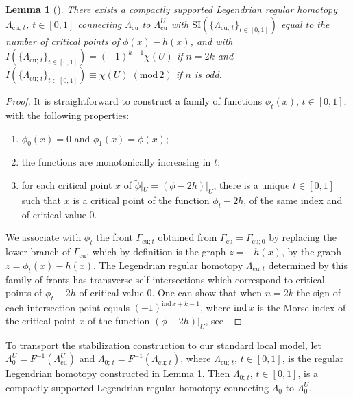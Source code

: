 \documentclass[reqno,11pt]{amsart}
\numberwithin{equation}{section}
\theoremstyle{my}
\theoremstyle{my}
\newtheorem{Lemma}[thm]{Lemma}
\theoremstyle{your}
\newcommand{\ind}{\mathrm{ind}}
\newcommand{\cu}{\mathrm{cu}}
\newcommand{\SI}{\mathrm{SI}}
\newcommand{\wt}{\widetilde}
\begin{document}
\begin{Lemma}[\cite{CieEli-Stein, Mur}]\label{lm:stab}
There exists a compactly supported Legendrian regular homotopy $\Lambda_{\cu;\,t}$, $t\in[0,1]$ connecting $\Lambda_\cu$ to $\Lambda^{U}_\cu$ with $\SI\left(\{\Lambda_{\cu;\,t}\}_{t\in[0,1]}\right)$ equal to the number of critical points of $\phi(x)-h(x)$, and with $I\left(\{\Lambda_{\cu;\,t}\}_{t\in[0,1]}\right)= (-1)^{k-1}\chi(U)$ if $n=2k$  and $I\left(\{\Lambda_{\cu;\,t}\}_{t\in[0,1]}\right)\equiv \chi(U)\; (\mathrm{mod}\, 2)$ if $n$ is odd.  
\end{Lemma}

\begin{proof}
It is straightforward to construct a family of functions $\phi_t(x)$, $t\in[0,1]$, with the following properties: 
\begin{enumerate}
\item  $\phi_0(x)=0$ and $\phi_1(x)=\phi(x) $;
\item the functions  are monotonically increasing in $t$; 
\item  for each critical point $x$ of $\wt\phi|_U=(\phi-2h)|_U$, there is a unique $t\in[0,1]$ such that $x$ is a critical point of  the function $\phi_t-2h$, of the same index and of critical value $0$.
\end{enumerate}
We associate with $\phi_t$ the front $\Gamma_{\cu;t}$ obtained from $\Gamma_{\cu} = \Gamma_{\cu;0}$ by replacing the lower branch of $\Gamma_{\cu}$, which by definition is  the graph 
$z=-h(x)$, by the graph $z=\phi_t(x)-h(x)$. The  Legendrian regular homotopy $\Lambda_{\cu;t}$ determined by this family of fronts has transverse self-intersections which correspond to critical points of $\phi_t-2h$ of critical value $0$. One can show that when $n=2k$ the sign of each intersection point equals $(-1)^{\ind\, x+k-1}$, where $\ind\,x$ is the Morse index of the critical point $x$ of the function $(\phi-2h)|_U$, see \cite{CieEli-Stein}.      
\end{proof}

 
To transport the stabilization construction to our standard local model, let  
$\Lambda_0^{U}=F^{-1}(\Lambda_{\cu}^{U})$ and $\Lambda_{0;\,t}=F^{-1}(\Lambda_{\cu;\,t})$, where $\Lambda_{\cu;\,t}$, $t\in[0,1]$, is the regular Legendrian homotopy constructed in Lemma \ref{lm:stab}. Then $\Lambda_{0;\,t}$,  $t\in[0,1]$,  is a compactly supported Legendrian regular homotopy connecting $\Lambda_0$ to $\Lambda^U_0$.
  
\end{document}

